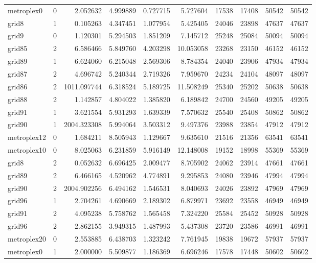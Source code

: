 \begin{longtable}{|l|r|r|r|r|r|r|r|r|r|}
metroplex0 & 0 & 2.052632 & 4.999889 & 0.727715 & 5.727604 & 17538 & 17408 & 50542 & 50542 \\
grid8 & 1 & 0.105263 & 4.347451 & 1.077954 & 5.425405 & 24046 & 23898 & 47637 & 47637 \\
grid9 & 0 & 1.120301 & 5.294503 & 1.851209 & 7.145712 & 25248 & 25084 & 50094 & 50094 \\
grid85 & 2 & 6.586466 & 5.849760 & 4.203298 & 10.053058 & 23268 & 23150 & 46152 & 46152 \\
grid89 & 1 & 6.624060 & 6.215048 & 2.569306 & 8.784354 & 24040 & 23906 & 47934 & 47934 \\
grid87 & 2 & 4.696742 & 5.240344 & 2.719326 & 7.959670 & 24234 & 24104 & 48097 & 48097 \\
grid86 & 2 & 1011.097744 & 6.318524 & 5.189725 & 11.508249 & 25340 & 25202 & 50638 & 50638 \\
grid88 & 2 & 1.142857 & 4.804022 & 1.385820 & 6.189842 & 24700 & 24560 & 49205 & 49205 \\
grid91 & 1 & 3.621554 & 5.931293 & 1.639339 & 7.570632 & 25540 & 25408 & 50862 & 50862 \\
grid90 & 1 & 2004.323308 & 5.994064 & 3.503312 & 9.497376 & 23988 & 23854 & 47912 & 47912 \\
metroplex12 & 0 & 1.684211 & 8.505943 & 1.129667 & 9.635610 & 21516 & 21356 & 63541 & 63541 \\
metroplex10 & 0 & 8.025063 & 6.231859 & 5.916149 & 12.148008 & 19152 & 18998 & 55369 & 55369 \\
grid8 & 2 & 0.052632 & 6.696425 & 2.009477 & 8.705902 & 24062 & 23914 & 47661 & 47661 \\
grid89 & 2 & 6.466165 & 4.520962 & 4.774891 & 9.295853 & 24080 & 23946 & 47994 & 47994 \\
grid90 & 2 & 2004.902256 & 6.494162 & 1.546531 & 8.040693 & 24026 & 23892 & 47969 & 47969 \\
grid96 & 1 & 2.704261 & 4.690669 & 2.189302 & 6.879971 & 23692 & 23558 & 46949 & 46949 \\
grid91 & 2 & 4.095238 & 5.758762 & 1.565458 & 7.324220 & 25584 & 25452 & 50928 & 50928 \\
grid96 & 2 & 2.862155 & 3.949315 & 1.487993 & 5.437308 & 23720 & 23586 & 46991 & 46991 \\
metroplex20 & 0 & 2.553885 & 6.438703 & 1.323242 & 7.761945 & 19838 & 19672 & 57937 & 57937 \\
metroplex0 & 1 & 2.000000 & 5.509877 & 1.186369 & 6.696246 & 17578 & 17448 & 50602 & 50602 \\

\end{longtable}
